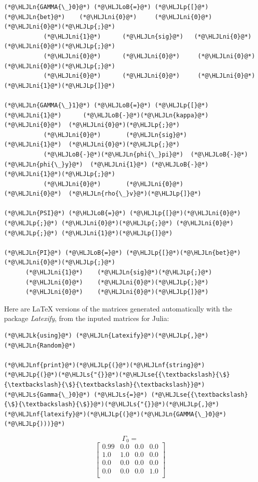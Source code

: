 \documentclass[12pt,a4paper]{article}
\newcommand{\HLJLk}[1]{\textcolor[RGB]{148,91,176}{\textbf{#1}}}
\newcommand{\HLJLn}[1]{#1}
\newcommand{\HLJLnf}[1]{\textcolor[RGB]{66,102,213}{#1}}
\newcommand{\HLJLs}[1]{\textcolor[RGB]{201,61,57}{#1}}
\newcommand{\HLJLse}[1]{\textcolor[RGB]{59,151,46}{#1}}
\newcommand{\HLJLni}[1]{\textcolor[RGB]{59,151,46}{#1}}
\newcommand{\HLJLoB}[1]{\textcolor[RGB]{102,102,102}{\textbf{#1}}}
\newcommand{\HLJLp}[1]{#1}
\begin{document}
\begin{lstlisting}
(*@\HLJLn{GAMMA{\_}0}@*) (*@\HLJLoB{=}@*) (*@\HLJLp{[}@*)(*@\HLJLn{bet}@*)    (*@\HLJLni{0}@*)     (*@\HLJLni{0}@*)  (*@\HLJLni{0}@*)(*@\HLJLp{;}@*)
           (*@\HLJLni{1}@*)      (*@\HLJLn{sig}@*)   (*@\HLJLni{0}@*)  (*@\HLJLni{0}@*)(*@\HLJLp{;}@*)
           (*@\HLJLni{0}@*)      (*@\HLJLni{0}@*)     (*@\HLJLni{0}@*)  (*@\HLJLni{0}@*)(*@\HLJLp{;}@*)
           (*@\HLJLni{0}@*)      (*@\HLJLni{0}@*)     (*@\HLJLni{0}@*)  (*@\HLJLni{1}@*)(*@\HLJLp{]}@*)

(*@\HLJLn{GAMMA{\_}1}@*) (*@\HLJLoB{=}@*) (*@\HLJLp{[}@*)(*@\HLJLni{1}@*)      (*@\HLJLoB{-}@*)(*@\HLJLn{kappa}@*)  (*@\HLJLni{0}@*)  (*@\HLJLni{0}@*)(*@\HLJLp{;}@*)
           (*@\HLJLni{0}@*)       (*@\HLJLn{sig}@*)    (*@\HLJLni{1}@*)  (*@\HLJLni{0}@*)(*@\HLJLp{;}@*)
           (*@\HLJLoB{-}@*)(*@\HLJLn{phi{\_}pi}@*)  (*@\HLJLoB{-}@*)(*@\HLJLn{phi{\_}y}@*)  (*@\HLJLni{1}@*) (*@\HLJLoB{-}@*)(*@\HLJLni{1}@*)(*@\HLJLp{;}@*)
           (*@\HLJLni{0}@*)       (*@\HLJLni{0}@*)      (*@\HLJLni{0}@*)  (*@\HLJLn{rho{\_}v}@*)(*@\HLJLp{]}@*)

(*@\HLJLn{PSI}@*) (*@\HLJLoB{=}@*) (*@\HLJLp{[}@*)(*@\HLJLni{0}@*)(*@\HLJLp{;}@*) (*@\HLJLni{0}@*)(*@\HLJLp{;}@*) (*@\HLJLni{0}@*)(*@\HLJLp{;}@*) (*@\HLJLni{1}@*)(*@\HLJLp{]}@*)

(*@\HLJLn{PI}@*) (*@\HLJLoB{=}@*) (*@\HLJLp{[}@*)(*@\HLJLn{bet}@*)  (*@\HLJLni{0}@*)(*@\HLJLp{;}@*)
      (*@\HLJLni{1}@*)    (*@\HLJLn{sig}@*)(*@\HLJLp{;}@*)
      (*@\HLJLni{0}@*)    (*@\HLJLni{0}@*)(*@\HLJLp{;}@*)
      (*@\HLJLni{0}@*)    (*@\HLJLni{0}@*)(*@\HLJLp{]}@*)
\end{lstlisting}


Here are LaTeX versions of the matrices generated automatically with the package \emph{Latexify}, from the inputed matrices for Julia:


\begin{lstlisting}
(*@\HLJLk{using}@*) (*@\HLJLn{Latexify}@*)(*@\HLJLp{,}@*) (*@\HLJLn{Random}@*)

(*@\HLJLnf{print}@*)(*@\HLJLp{(}@*)(*@\HLJLnf{string}@*)(*@\HLJLp{(}@*)(*@\HLJLs{"{}}@*)(*@\HLJLse{{\textbackslash}{\$}{\textbackslash}{\$}{\textbackslash}{\textbackslash}}@*)(*@\HLJLs{Gamma{\_}0}@*) (*@\HLJLs{=}@*) (*@\HLJLse{{\textbackslash}{\$}{\textbackslash}{\$}}@*)(*@\HLJLs{"{}}@*)(*@\HLJLp{,}@*)(*@\HLJLnf{latexify}@*)(*@\HLJLp{(}@*)(*@\HLJLn{GAMMA{\_}0}@*)(*@\HLJLp{)))}@*)
\end{lstlisting}

$$\Gamma_0 = $$\begin{equation}
\left[
\begin{array}{cccc}
0.99 & 0.0 & 0.0 & 0.0 \\
1.0 & 1.0 & 0.0 & 0.0 \\
0.0 & 0.0 & 0.0 & 0.0 \\
0.0 & 0.0 & 0.0 & 1.0 \\
\end{array}
\right]
\end{equation}
\end{document}
